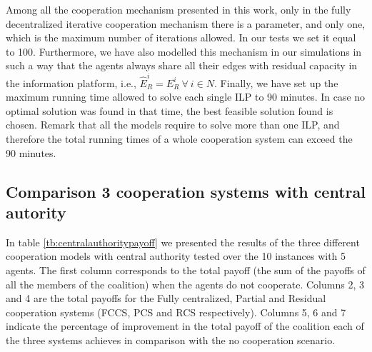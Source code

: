 \documentclass{article}
\begin{document}
Among all the cooperation mechanism presented in this work, only in the fully decentralized iterative cooperation mechanism there is a parameter, and only one, which is the maximum number of iterations allowed. In our tests we set it equal to 100. Furthermore, we have also modelled this mechanism in our simulations in such a way that the agents always share all their edges with residual capacity in the information platform, i.e., $\widehat{E}_R^i=E_R^i\ \forall\ i\in N$. Finally, we have set up the maximum running time allowed to solve each single ILP to 90 minutes. In case no optimal solution was found in that time, the best feasible solution found is chosen. Remark that all the models require to solve more than one ILP, and therefore the total running times of a whole cooperation system can exceed the 90 minutes.

\subsection{Comparison 3 cooperation systems with central autority}

In table \ref{tb:centralauthoritypayoff} we presented the results of the three different cooperation models with central authority tested over the 10 instances with 5 agents. The first column corresponds to the total payoff (the sum of the payoffs of all the members of the coalition) when the agents do not cooperate. Columns 2, 3 and 4 are the total payoffs for the Fully centralized, Partial and Residual cooperation systems (FCCS, PCS and RCS respectively). Columns 5, 6 and 7 indicate the percentage of improvement in the total payoff of the coalition each of the three systems achieves in comparison with the no cooperation scenario.
\end{document}
